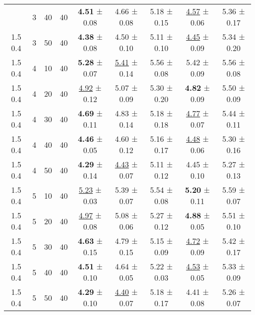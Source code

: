 \begin{tabular}{ccccccccc}
\begin{tabular}{lllllllll}
1.5 0.4 & 3 & 40 & 40 &    \textbf{4.51} ± 0.08 &             4.66 ± 0.08 & 5.18 ± 0.15 & \underline{4.57} ± 0.06 & 5.36 ± 0.17 \\
1.5 0.4 & 3 & 50 & 40 &    \textbf{4.38} ± 0.08 &             4.50 ± 0.10 & 5.11 ± 0.10 & \underline{4.45} ± 0.09 & 5.34 ± 0.20 \\
1.5 0.4 & 4 & 10 & 40 &    \textbf{5.28} ± 0.07 & \underline{5.41} ± 0.14 & 5.56 ± 0.08 &             5.42 ± 0.09 & 5.56 ± 0.08 \\
1.5 0.4 & 4 & 20 & 40 & \underline{4.92} ± 0.12 &             5.07 ± 0.09 & 5.30 ± 0.20 &    \textbf{4.82} ± 0.09 & 5.50 ± 0.09 \\
1.5 0.4 & 4 & 30 & 40 &    \textbf{4.69} ± 0.11 &             4.83 ± 0.14 & 5.18 ± 0.18 & \underline{4.77} ± 0.07 & 5.44 ± 0.11 \\
1.5 0.4 & 4 & 40 & 40 &    \textbf{4.46} ± 0.05 &             4.60 ± 0.12 & 5.16 ± 0.17 & \underline{4.48} ± 0.06 & 5.30 ± 0.16 \\
1.5 0.4 & 4 & 50 & 40 &    \textbf{4.29} ± 0.14 & \underline{4.43} ± 0.07 & 5.11 ± 0.12 &             4.45 ± 0.10 & 5.27 ± 0.13 \\
1.5 0.4 & 5 & 10 & 40 & \underline{5.23} ± 0.03 &             5.39 ± 0.07 & 5.54 ± 0.08 &    \textbf{5.20} ± 0.11 & 5.59 ± 0.07 \\
1.5 0.4 & 5 & 20 & 40 & \underline{4.97} ± 0.08 &             5.08 ± 0.06 & 5.27 ± 0.12 &    \textbf{4.88} ± 0.05 & 5.51 ± 0.10 \\
1.5 0.4 & 5 & 30 & 40 &    \textbf{4.63} ± 0.15 &             4.79 ± 0.15 & 5.15 ± 0.09 & \underline{4.72} ± 0.09 & 5.42 ± 0.17 \\
1.5 0.4 & 5 & 40 & 40 &    \textbf{4.51} ± 0.10 &             4.64 ± 0.05 & 5.22 ± 0.03 & \underline{4.53} ± 0.05 & 5.33 ± 0.09 \\
1.5 0.4 & 5 & 50 & 40 &    \textbf{4.29} ± 0.10 & \underline{4.40} ± 0.07 & 5.18 ± 0.17 &             4.41 ± 0.08 & 5.26 ± 0.07 \\
\bottomrule
\end{tabular}

